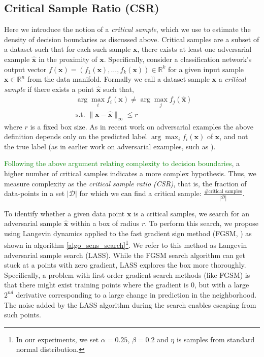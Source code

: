 \documentclass{article}
\newcommand{\af}[1]{\textcolor{green}{#1}}
\newcommand{\af}[1]{\textcolor{black}{#1}}
\begin{document}
\subsection{Critical Sample Ratio (CSR)}
Here we introduce the notion of a {\it critical sample}, which we use to estimate the density of decision boundaries as discussed above.
Critical samples are a subset of a dataset such that for each such sample $\mathbf{x}$, there exists at least one adversarial example $\hat{\mathbf{x}}$ in the proximity of $\mathbf{x}$. 
Specifically, consider a classification network's output vector $ f(\mathbf{x}) =(f_1(\mathbf{x}), \dots, f_k(\mathbf{x})) \in \mathbb{R}^k $ for a given input sample $ \mathbf{x} \in \mathbb{R}^{n}$ from the data manifold. 
Formally we call a dataset sample $ \mathbf{x} $ a \emph{critical sample} if there exists a point $ \hat{\mathbf{x}} $ such that,
\begin{align}
\label{eq_sens}
&\arg \max_{i} f_{i}(\mathbf{x}) \neq \arg \max_{j} f_{j}(\hat{\mathbf{x}}) \mspace{5mu}  \\ \nonumber
& \mbox{s.t.  } \lVert \mathbf{x} - \hat{\mathbf{x}} \rVert_{\infty} \leq r
\end{align}
where $r$ is a fixed box size.
As in recent work on adversarial examples \citep{kurakin2016adversarial} the above definition depends only on the predicted label $ \arg \max_{i} f_{i}(\mathbf{x}) $ of $ \mathbf{x} $, and not the true label (as in earlier work on adversarial examples, such as \citet{adversarial_examples,goodfellow2014explaining}).


\af{Following the above argument relating complexity to decision boundaries}, a higher number of critical samples indicates a more complex hypothesis. Thus, we measure complexity as the {\it critical sample ratio (CSR)}, that is, the fraction of data-points in a set $|\mathcal{D}|$ for which we can find a critical sample: $ \frac{\# \text{critical samples}}{|\mathcal{D}|}$.

To identify whether a given data point $ \mathbf{x} $ is a critical samples, we search for an adversarial sample $ \hat{\mathbf{x}} $ within a box of radius $r$.
To perform this search, we propose using Langevin dynamics applied to the fast gradient sign method (FGSM, \citet{goodfellow2014explaining}) as shown in algorithm \ref{algo_sens_search}\footnote{In our experiments, we set $\alpha=0.25$, $\beta=0.2$ and $\eta$ is samples from standard normal distribution.}.
We refer to this method as Langevin adversarial sample search (LASS).
While the FGSM search algorithm can get stuck at a points with zero gradient, LASS explores the box more thoroughly.
Specifically, a problem with first order gradient search methods (like FGSM) is that there might exist training points where the gradient is 0, but with a large $2^{nd}$ derivative corresponding to a large change in prediction in the neighborhood. 
The noise added by the LASS algorithm during the search enables escaping from such points.
\end{document}
